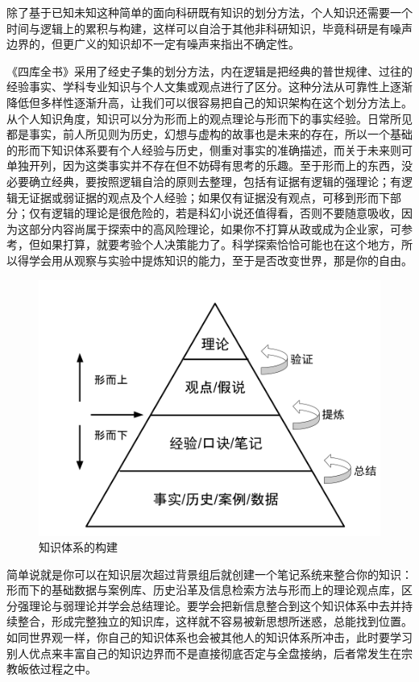 \documentclass[]{tufte-book}
\begin{document}
除了基于已知未知这种简单的面向科研既有知识的划分方法，个人知识还需要一个时间与逻辑上的累积与构建，这样可以自洽于其他非科研知识，毕竟科研是有噪声边界的，但更广义的知识却不一定有噪声来指出不确定性。

《四库全书》采用了经史子集的划分方法，内在逻辑是把经典的普世规律、过往的经验事实、学科专业知识与个人文集或观点进行了区分。这种分法从可靠性上逐渐降低但多样性逐渐升高，让我们可以很容易把自己的知识架构在这个划分方法上。从个人知识角度，知识可以分为形而上的观点理论与形而下的事实经验。日常所见都是事实，前人所见则为历史，幻想与虚构的故事也是未来的存在，所以一个基础的形而下知识体系要有个人经验与历史，侧重对事实的准确描述，而关于未来则可单独开列，因为这类事实并不存在但不妨碍有思考的乐趣。至于形而上的东西，没必要确立经典，要按照逻辑自洽的原则去整理，包括有证据有逻辑的强理论；有逻辑无证据或弱证据的观点及个人经验；如果仅有证据没有观点，可移到形而下部分；仅有逻辑的理论是很危险的，若是科幻小说还值得看，否则不要随意吸收，因为这部分内容尚属于探索中的高风险理论，如果你不打算从政或成为企业家，可参考，但如果打算，就要考验个人决策能力了。科学探索恰恰可能也在这个地方，所以得学会用从观察与实验中提炼知识的能力，至于是否改变世界，那是你的自由。

\begin{figure}
\includegraphics{data/knowledge} \caption[知识体系的构建]{知识体系的构建}\label{fig:unnamed-chunk-2}
\end{figure}

简单说就是你可以在知识层次超过背景组后就创建一个笔记系统来整合你的知识：形而下的基础数据与案例库、历史沿革及信息检索方法与形而上的理论观点库，区分强理论与弱理论并学会总结理论。要学会把新信息整合到这个知识体系中去并持续整合，形成完整独立的知识库，这样就不容易被新思想所迷惑，总能找到位置。如同世界观一样，你自己的知识体系也会被其他人的知识体系所冲击，此时要学习别人优点来丰富自己的知识边界而不是直接彻底否定与全盘接纳，后者常发生在宗教皈依过程之中。
\end{document}
